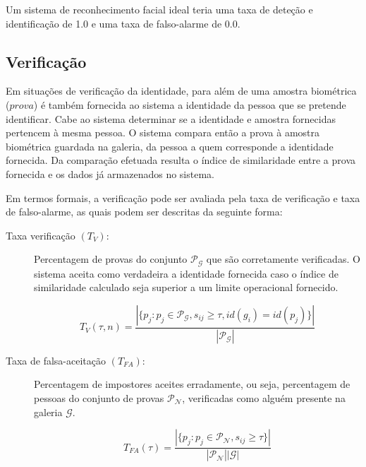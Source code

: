 Um sistema de reconhecimento facial ideal teria uma taxa de deteção e identificação de 1.0 e uma taxa de falso-alarme de 0.0.

\subsection{Verificação}
Em situações de verificação da identidade, para além de uma amostra biométrica ($prova$) é também fornecida ao sistema a identidade da pessoa que se pretende identificar. Cabe ao sistema determinar se a identidade e amostra fornecidas pertencem à mesma pessoa. O sistema compara então a prova à amostra biométrica guardada na galeria, da pessoa a quem corresponde a identidade fornecida. Da comparação efetuada resulta o índice de similaridade entre a prova fornecida e os dados já armazenados no sistema.

Em termos formais, a verificação pode ser avaliada pela taxa de verificação e taxa de falso-alarme, as quais podem ser descritas da seguinte forma:

\begin{description}
 \item[Taxa verificação $(T_{V})$:] Percentagem de provas do conjunto $\mathscr{P}_\mathscr{G}$ que são corretamente verificadas. O sistema aceita como verdadeira a identidade fornecida caso o índice de similaridade calculado seja superior a um  limite operacional fornecido.

\begin{equation}
 T_{V}(\tau, n) = \frac{|\{p_j:p_j \in \mathscr{P}_\mathscr{G}, s_{ij} \geqslant \tau, id(g_i)=id(p_j)\}|}{|\mathscr{P}_\mathscr{G}|}
\end{equation}

  \item[Taxa de falsa-aceitação $(T_{FA})$:] Percentagem de impostores aceites erradamente, ou seja, percentagem de pessoas do conjunto de provas $\mathscr{P}_\mathscr{N}$, verificadas como alguém presente na galeria $\mathscr{G}$.
  
\begin{equation}
 T_{FA}(\tau) = \frac{|\{p_j:p_j \in \mathscr{P}_\mathscr{N}, s_{ij} \geqslant \tau\}|}{|\mathscr{P}_\mathscr{N}||\mathscr{G}|}
\end{equation}
\end{description}

